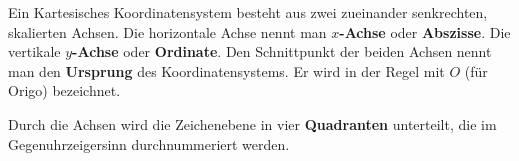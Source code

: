 \begin{center}

\end{center}

Ein Kartesisches Koordinatensystem besteht aus zwei zueinander
senkrechten, skalierten Achsen. Die horizontale Achse nennt man
\textbf{\(x\)-Achse} oder \textbf{Abszisse}. Die vertikale
\textbf{\(y\)-Achse} oder \textbf{Ordinate}. Den Schnittpunkt der beiden
Achsen nennt man den \textbf{Ursprung} des Koordinatensystems.
Er wird in der Regel mit \(O\) (für Origo) bezeichnet.

Durch die Achsen wird die Zeichenebene in vier \textbf{Quadranten}
unterteilt, die im Gegenuhrzeigersinn durchnummeriert werden.


